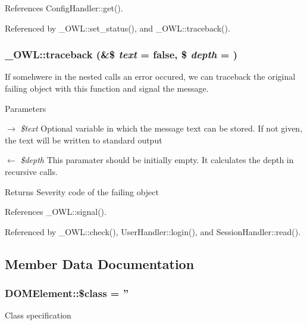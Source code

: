 References ConfigHandler::get().



Referenced by \_\-OWL::set\_\-status(), and \_\-OWL::traceback().

\subsubsection[{traceback}]{\setlength{\rightskip}{0pt plus 5cm}\_\-OWL::traceback (\&\$ {\em text} = {\ttfamily false}, \/  \$ {\em depth} = {})}\label{class__OWL_aa29547995d6741b7d2b90c1d4ea99a13}
If somehwere in the nested calls an error occured, we can traceback the original failing object with this function and signal the message.


\begin{DoxyParams}{Parameters}
\item[\mbox{$\rightarrow$} {\em \$text}]Optional variable in which the message text can be stored. If not given, the text will be written to standard output \item[\mbox{$\leftarrow$} {\em \$depth}]This paramater should be initially empty. It calculates the depth in recursive calls. \end{DoxyParams}
\begin{DoxyReturn}{Returns}
Severity code of the failing object 
\end{DoxyReturn}


References \_\-OWL::signal().



Referenced by \_\-OWL::check(), UserHandler::login(), and SessionHandler::read().



\subsection{Member Data Documentation}
\subsubsection[{\$class}]{\setlength{\rightskip}{0pt plus 5cm}DOMElement::\$class = ''}\label{classDOMElement_a5114a8be2c698c735ec897857156d252}
Class specification 
